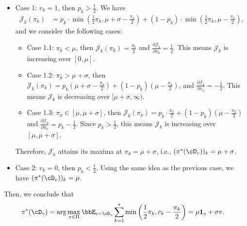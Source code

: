     \begin{itemize}
        \item Case 1: $v_k = 1$, then $p_k > \frac{1}{2}$. We have
        \begin{equation*}
            \begin{aligned}
                \mathcal J_k(\pi_k) &= p_k \cdot\min\left(\frac{1}{2}\pi_k, \mu + \sigma - \frac{\pi_k}{2}\right) + (1 - p_k)\cdot \min\left(\frac{1}{2}\pi_k, \mu - \frac{\pi_k}{2}\right),
            \end{aligned}
        \end{equation*}
        and we consider the following cases:
        \begin{itemize}
            \item Case 1.1: $\pi_k < \mu$, then $\mathcal J_k(\pi_k) = \frac{\pi_k}{2}$ and $\frac{\partial \mathcal J_k}{\partial \pi_k} = \frac{1}{2}$. This means $\mathcal J_k$ is increasing over $[0, \mu]$.
            \item Case 1.2: $\pi_k > \mu + \sigma$, then $\mathcal J_k(\pi_k) = p_k\left(\mu + \sigma - \frac{\pi_k}{2}\right) + (1 - p_k)\left(\mu -  \frac{\pi_k}{2}\right)$, and $\frac{\partial \mathcal J_k}{\partial \pi_k} = -\frac{1}{2}$. This means $\mathcal J_k$ is decreasing over $[\mu + \sigma, \infty)$.
            \item Case 1.3: $\pi_k \in [\mu, \mu + \sigma]$, then $\mathcal J_k(\pi_k) = p_k\cdot \frac{\pi_k}{2} + (1 - p_k)(\mu - \frac{\pi_k}{2})$ and $\frac{\partial \mathcal J_k}{\partial \pi_k} = p_k - \frac{1}{2}$. Since $p_k > \frac{1}{2}$, this means $\mathcal J_k$ is increasing over $[\mu, \mu + \sigma]$.
        \end{itemize}
        Therefore, $\mathcal J_k$ attains its maxima at $\pi_k = \mu + \sigma$, i.e., $(\pi^*(\cD_v))_k = \mu + \sigma$.

        \item Case 2: $v_k = 0$, then $p_k < \frac{1}{2}$. Using the same idea as the previous case, we have $(\pi^*(\cD_v))_k = \mu$.
    \end{itemize}
    Then, we conclude that 
    \begin{equation*}
        \begin{aligned}
            \pi^*(\cD_v) &= \arg\max_{\pi \in \Pi}\bbE_{c \sim \cD_v} \sum_{k = 1}^s \min\left(\frac{1}{2}\pi_k, c_k - \frac{\pi_k}{2}\right) = \mu \mathbf{1}_s + \sigma v.
        \end{aligned}
    \end{equation*}

